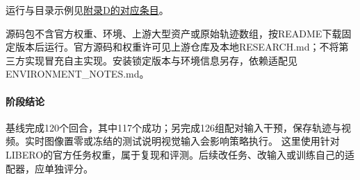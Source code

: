 \noindent 运行与目录示例见\hyperlink{s08-command-1}{附录D的对应条目}。\par

源码包不含官方权重、环境、上游大型资产或原始轨迹数组，按README下载固定版本后运行。官方源码和权重许可见上游仓库及本地RESEARCH.md；不将第三方实现冒充自主实现。安装锁定版本与环境信息另存，依赖适配见 ENVIRONMENT\_NOTES.md。


\paragraph{阶段结论}基线完成120个回合，其中117个成功；另完成126组配对输入干预，保存轨迹与视频。实时图像置零或冻结的测试说明视觉输入会影响策略执行。 这里使用针对LIBERO的官方任务权重，属于复现和评测。后续改任务、改输入或训练自己的适配器，应单独评分。


\FloatBarrier
